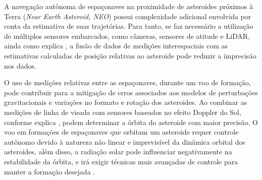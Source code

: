 A navegação autônoma de espaçonaves na proximidade de asteroides próximos à Terra (\emph{Near Earth Asteroid, NEO}) possui complexidade adicional envolvida por conta da estimativa de suas trajetórias.
Para tanto, se faz necessário a utilização de múltiplos sensores embarcados, como câmeras, sensores de atitude e LiDAR, ainda como explica \cite{vetrisano2015autonomous}, a fusão de dados de medições interespaciais com as estimativas calculadas de posição relativas ao asteroide pode reduzir a imprecisão nos dados.

O uso de medições relativas entre as espaçonaves, durante um voo de formação, pode contribuir para a mitigação de erros associados aos modelos de perturbações gravitacionais e variações no formato e rotação dos asteroides.
Ao combinar as medições de linha de visada com sensores baseados no efeito Doppler do Sol, conforme explica \cite{yim2000autonomous}, podem determinar a órbita do asteroide com maior precisão.
O voo em formações de espaçonaves que orbitam um asteroide requer controle autônomo devido à natureza não linear e imprevisível da dinâmica orbital dos asteroides, além disso, a radiação solar pode influenciar negativamente na estabilidade da órbita, e irá exigir técnicas mais avançadas de controle para manter a formação desejada \cite{vetrisano2015autonomous}.
